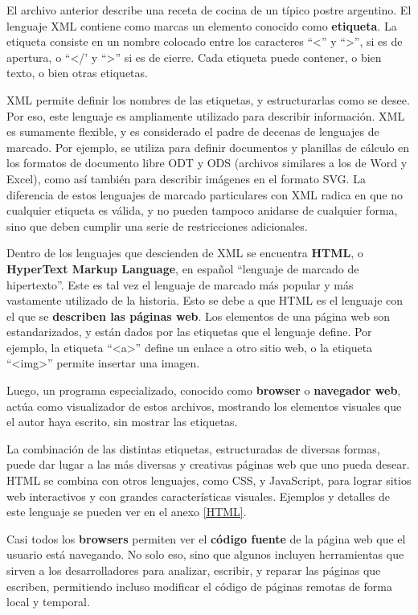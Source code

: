 El archivo anterior describe una receta de cocina de un típico postre argentino.
El lenguaje XML contiene como marcas un elemento conocido como
\textbf{etiqueta}. La etiqueta consiste en un nombre colocado entre los
caracteres ``<'' y ``>'', si es de apertura, o ``</' y ``>'' si es de cierre.
Cada etiqueta puede contener, o bien texto, o bien otras etiquetas.

XML permite definir los nombres de las etiquetas, y estructurarlas como se
desee. Por eso, este lenguaje es ampliamente utilizado para describir
información. XML es sumamente flexible, y es considerado el padre de decenas de
lenguajes de marcado. Por ejemplo, se utiliza para definir documentos y
planillas de cálculo en los formatos de documento libre ODT y ODS (archivos
similares a los de Word y Excel), como así también para describir imágenes en el
formato SVG. La diferencia de estos lenguajes de marcado particulares con XML
radica en que no cualquier etiqueta es válida, y no pueden tampoco anidarse de
cualquier forma, sino que deben cumplir una serie de restricciones adicionales.

Dentro de los lenguajes que descienden de XML se encuentra \textbf{HTML}, o
\textbf{HyperText Markup Language}, en español ``lenguaje de marcado de
hipertexto''. Este es tal vez el lenguaje de marcado más popular y más
vastamente utilizado de la historia. Esto se debe a que HTML es el lenguaje con
el que se \textbf{describen las páginas web}. Los elementos de una página web
son estandarizados, y están dados por las etiquetas que el lenguaje define. Por
ejemplo, la etiqueta ``<a>'' define un enlace a otro sitio web, o la etiqueta
``<img>'' permite insertar una imagen.

Luego, un programa especializado, conocido como \textbf{browser} o
\textbf{navegador web}, actúa como visualizador de estos archivos, mostrando los
elementos visuales que el autor haya escrito, sin mostrar las etiquetas.

La combinación de las distintas etiquetas, estructuradas de diversas formas,
puede dar lugar a las más diversas y creativas páginas web que uno pueda desear.
HTML se combina con otros lenguajes, como CSS, y JavaScript, para lograr sitios
web interactivos y con grandes características visuales. Ejemplos y detalles de
este lenguaje se pueden ver en el anexo \ref{HTML}.

\begin{knowwhat} Casi todos los \textbf{browsers} permiten ver
    el \textbf{código fuente} de la página web que el usuario está navegando. No
    solo eso, sino que algunos incluyen herramientas que sirven a los
    desarrolladores para analizar, escribir, y reparar las páginas que escriben,
    permitiendo incluso modificar el código de páginas remotas de forma local y
    temporal.
\end{knowwhat}

